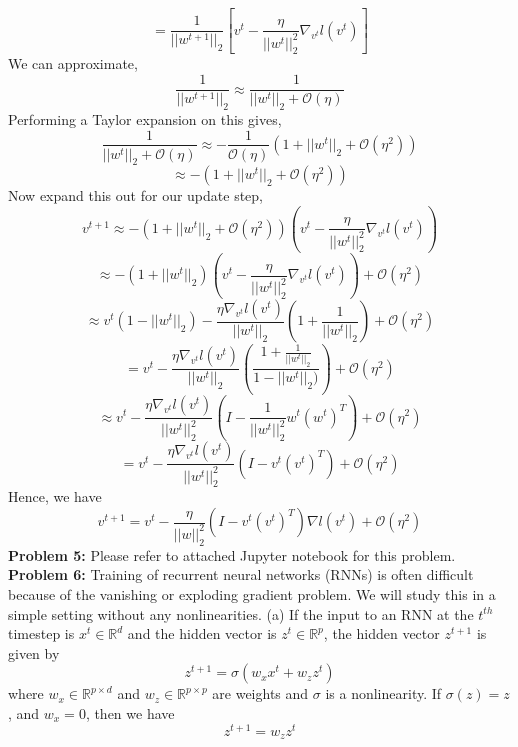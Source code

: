 \documentclass[12pt]{article}
\begin{document}
$$ = \frac{1}{ ||w^{t+1}||_2 }  [ v^{t}  - \frac{ \eta}{ ||w^{t}||_2^{2} }     \nabla_{v^{t} } l ( v^{t} )]         $$
We can approximate, 
$$\frac{1}{ ||w^{t+1}||_2 }   \approx \frac{1}{ ||w^{t} ||_{2} + \mathcal{O} (\eta )  }   $$
Performing a Taylor expansion on this gives,
$$ \frac{1}{ ||w^{t} ||_{2} + \mathcal{O} (\eta )  }  \approx -\frac{1}{\mathcal{O} (\eta ) }  ( 1 + ||w^{t}||_{2}  +  \mathcal{O} (\eta^{2}) )    $$
$$ \approx   - (1 +||w^{t}||_{2}  +  \mathcal{O} (\eta^2 )  )  $$
Now expand this out for our update step,
$$ v^{t+1} \approx  - (1 +||w^{t}||_{2}  +  \mathcal{O} (\eta^{2} ) )(  v^{t}  - \frac{ \eta}{ ||w^{t}||_2^{2} }     \nabla_{v^{t} } l ( v^{t} )  )  $$
 $$ \approx -(1 +||w^{t}||_{2}  )(v^{t}  - \frac{ \eta}{ ||w^{t}||_2^{2} }     \nabla_{v^{t} } l ( v^{t} )  )  +  \mathcal{O} (\eta^2 )  $$
$$  \approx  v^{t} ( 1 -  ||w^{t}||_{2} )  -  \frac{ \eta   \nabla_{v^{t} } l ( v^{t} )}{ ||w^{t}||_2}(1+ \frac{1}{||w^{t}||_2} )   +   \mathcal{O} (\eta^2 ) $$
$$ = v^{t}   -  \frac{ \eta   \nabla_{v^{t} } l ( v^{t} )}{ ||w^{t}||_2} ( \frac{1+ \frac{1}{||w^{t}||_2}}{  1 -  ||w^{t}||_{2} )}  )    +   \mathcal{O} (\eta^2 ) $$ 
$$ \approx  v^{t}   -  \frac{ \eta   \nabla_{v^{t} } l ( v^{t} )}{ ||w^{t}||_2^{2} }( I - \frac{1}{ ||w^{t}||_2^{2} } w^{t}(w^{t})^{T}  ) + \mathcal{O} (\eta^2 )   $$
$$ =  v^{t}   -  \frac{ \eta   \nabla_{v^{t} } l ( v^{t} )}{ ||w^{t}||_2^{2} }( I -  v^{t}(v^{t})^{T}  ) + \mathcal{O} (\eta^2 )    $$
Hence, we have 
$$ v^{t+1}  =  v^{t} - \frac{\eta}{||w||_{2}^{2}}( I - v^{t}(v^{t})^{T}) \nabla l (v^{t})   + \mathcal{O}  (\eta^{2}) $$
\newline 
\textbf{Problem 5:}  \newline
Please refer to attached Jupyter notebook for this problem.\newline \newline 
\textbf{Problem 6:}  \newline
Training of recurrent neural networks (RNNs) is often difficult because of the vanishing or exploding gradient problem. We will study this in a simple setting without any nonlinearities. \newline 
(a) If the input to an RNN at the $t^{th}$ timestep is $x^{t} \in \mathbb{R}^{d}$ and the hidden vector is $z^{t} \in \mathbb{R}^{p}$, the hidden vector $z^{t+1}$ is given by 
$$z^{t+1} = \sigma (w_x x^{t} + w_z z^{t}  )  $$ 
where $w_x \in \mathbb{R}^{p\times d}$ and  $w_z \in \mathbb{R}^{p\times p}$ are weights and $\sigma$ is a nonlinearity.  If $\sigma (z) = z$, and $w_x = 0 $, then we have
$$ z^{t+1} = w_{z} z^{t} $$
\end{document}
